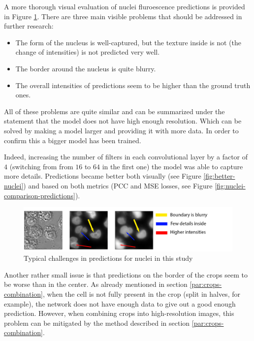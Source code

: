 A more thorough visual evaluation of nuclei fluroescence predictions is provided in Figure \ref{fig:nuclei-troubles}. There are three main visible problems that should be addressed in further research:
\begin{itemize}
	\item The form of the nucleus is well-captured, but the texture inside is not (the change of intensities) is not predicted very well.
	\item The border around the nucleus is quite blurry.
	\item The overall intensities of predictions seem to be higher than the ground truth ones.
\end{itemize}

All of these problems are quite similar and can be summarized under the statement that the model does not have high enough resolution. Which can be solved by making a model larger and providing it with more data. In order to confirm this a bigger model has been trained.

Indeed, increasing the number of filters in each convolutional layer by a factor of $4$ (switching from from $16$ to $64$ in the first one) the model was able to capture more details. Predictions became better both visually (see Figure \ref{fig:better-nuclei}) and based on both metrics (PCC and MSE losses, see Figure \ref{fig:nuclei-comparison-predictions}).

\begin{figure}[htb]
	\begin{center}
		\includegraphics[width=0.8\linewidth]{bilder/nuclei/problems.png}
		\caption{Typical challenges in predictions for nuclei in this study}\label{fig:nuclei-troubles}
	\end{center}
\end{figure}

Another rather small issue is that predictions on the border of the crops seem to be worse than in the center. As already mentioned in section \ref{par:crops-combination}, when the cell is not fully present in the crop (split in halves, for example), the network does not have enough data to give out a good enough prediction. However, when combining crops into high-resolution images, this problem can be mitigated by the method described in section \ref{par:crops-combination}.

